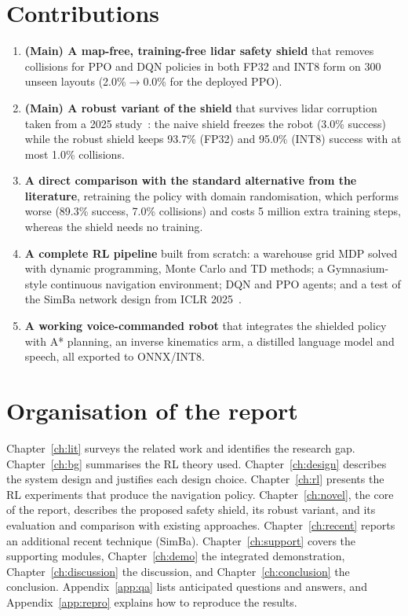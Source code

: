 \documentclass[12pt,a4paper,oneside]{report}
\begin{document}
\section{Contributions}
\begin{enumerate}
\item \textbf{(Main) A map-free, training-free lidar safety shield} that removes collisions for PPO and DQN policies
in both FP32 and INT8 form on 300 unseen layouts (2.0\%$\to$0.0\% for the deployed PPO).
\item \textbf{(Main) A robust variant of the shield} that survives lidar corruption taken from a 2025
study~\cite{omni2025}: the naive shield freezes the robot (3.0\% success) while the robust shield keeps 93.7\%
(FP32) and 95.0\% (INT8) success with at most 1.0\% collisions.
\item \textbf{A direct comparison with the standard alternative from the literature}, retraining the policy with
domain randomisation, which performs worse (89.3\% success, 7.0\% collisions) and costs 5 million extra training
steps, whereas the shield needs no training.
\item \textbf{A complete RL pipeline} built from scratch: a warehouse grid MDP solved with dynamic programming,
Monte Carlo and TD methods; a Gymnasium-style continuous navigation environment; DQN and PPO agents; and a test of
the SimBa network design from ICLR 2025~\cite{simba2025}.
\item \textbf{A working voice-commanded robot} that integrates the shielded policy with A* planning, an inverse
kinematics arm, a distilled language model and speech, all exported to ONNX/INT8.
\end{enumerate}

\section{Organisation of the report}
Chapter~\ref{ch:lit} surveys the related work and identifies the research gap. Chapter~\ref{ch:bg} summarises the
RL theory used. Chapter~\ref{ch:design} describes the system design and justifies each design choice.
Chapter~\ref{ch:rl} presents the RL experiments that produce the navigation policy. Chapter~\ref{ch:novel}, the
core of the report, describes the proposed safety shield, its robust variant, and its evaluation and comparison
with existing approaches. Chapter~\ref{ch:recent} reports an additional recent technique (SimBa).
Chapter~\ref{ch:support} covers the supporting modules, Chapter~\ref{ch:demo} the integrated demonstration,
Chapter~\ref{ch:discussion} the discussion, and Chapter~\ref{ch:conclusion} the conclusion. Appendix~\ref{app:qa}
lists anticipated questions and answers, and Appendix~\ref{app:repro} explains how to reproduce the results.
\end{document}

